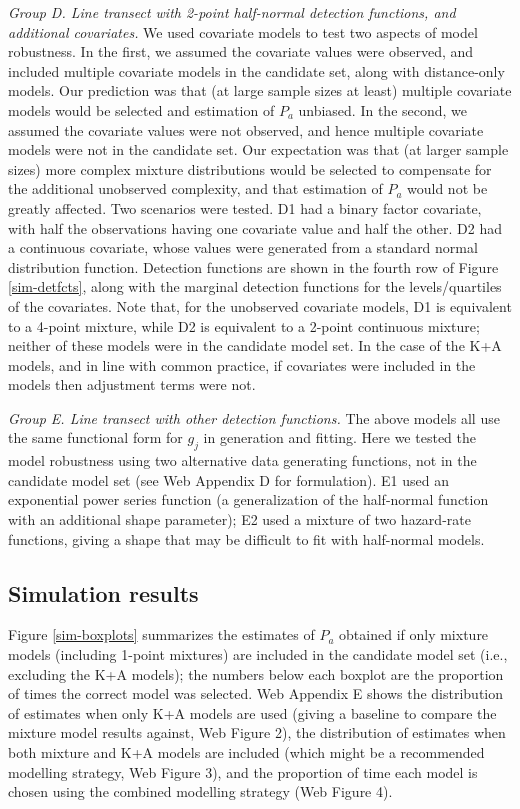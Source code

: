 \documentclass[useAMS,referee,usenatbib]{biom}
\begin{document}
\textit{Group D. Line transect with 2-point half-normal detection functions, and additional covariates.}  We used covariate models to test two aspects of model robustness. In the first, we assumed the covariate values were observed, and included multiple covariate models in the candidate set, along with distance-only models. Our prediction was that (at large sample sizes at least) multiple covariate models would be selected and estimation of $P_a$ unbiased.  In the second, we assumed the covariate values were not observed, and hence multiple covariate models were not in the candidate set.  Our expectation was that (at larger sample sizes) more complex mixture distributions would be selected to compensate for the additional unobserved complexity, and that estimation of $P_a$ would not be greatly affected.  Two scenarios were tested.  D1 had a binary factor covariate, with half the observations having one covariate value and half the other.  D2 had a continuous covariate, whose values were generated from a standard normal distribution function.  Detection functions are shown in the fourth row of Figure \ref{sim-detfcts}, along with the marginal detection functions for the levels/quartiles of the covariates. Note that, for the unobserved covariate models, D1 is equivalent to a 4-point mixture, while D2 is equivalent to a 2-point continuous mixture; neither of these models were in the candidate model set.  In the case of the K+A models, and in line with common practice, if covariates were included in the models then adjustment terms were not.

\textit{Group E. Line transect with other detection functions.} The above models all use the same functional form for $g_j$ in generation and fitting.  Here we tested the model robustness using two alternative data generating functions, not in the candidate model set (see Web Appendix D for formulation).  E1 used an exponential power series function (a generalization of the half-normal function with an additional shape parameter); E2 used a mixture of two hazard-rate functions, giving a shape that may be difficult to fit with half-normal models.
  
\subsection{Simulation results}
\label{s:sims_res}

Figure \ref{sim-boxplots} summarizes the estimates of $P_a$ obtained if only mixture models (including 1-point mixtures) are included in the candidate model set (i.e., excluding the K+A models); the numbers below each boxplot are the proportion of times the correct model was selected.  Web Appendix E shows the distribution of estimates when only K+A models are used (giving a baseline to compare the mixture model results against, Web Figure 2), the distribution of estimates when both mixture and K+A models are included (which might be a recommended modelling strategy, Web Figure 3), and the proportion of time each model is chosen using the combined modelling strategy (Web Figure 4).
\end{document}
